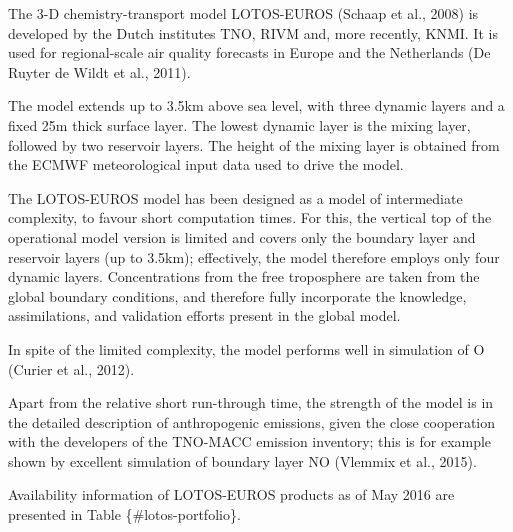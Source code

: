 \documentclass[9pt]{report}
\begin{document}
\noindent{}The 3-D chemistry-transport model LOTOS-EUROS (Schaap et al., 2008) is developed by the Dutch institutes TNO, RIVM and, more recently, KNMI.
It is used for regional-scale air quality forecasts in Europe and the Netherlands (De Ruyter de Wildt et al., 2011).%

The model extends up to 3.5km above sea level, with three dynamic layers and a ﬁxed 25m thick surface layer. 
The lowest dynamic layer is the mixing layer, followed by two reservoir layers. 
The height of the mixing layer is obtained from the ECMWF meteorological input data used to drive the model.%

The LOTOS-EUROS model has been designed as a model of intermediate complexity, to favour short computation times. 
For this, the vertical top of the operational model version is limited and covers only the boundary layer and reservoir layers (up to 3.5km); effectively, the model therefore employs only four dynamic layers. 
Concentrations from the free troposphere are taken from the global boundary conditions, and therefore fully incorporate the knowledge, assimilations, and validation efforts present in the global model.%

In spite of the limited complexity, the model performs well in simulation of O (Curier et al., 2012).%

Apart from the relative short run-through time, the strength of the model is in the detailed description of anthropogenic emissions, given the close cooperation with the developers of the TNO-MACC emission inventory; this is for example shown by excellent simulation of boundary layer NO (Vlemmix et al., 2015).%

Availability information of LOTOS-EUROS products as of May 2016 are presented in Table \{\#lotos-portfolio\}.%
\end{document}
